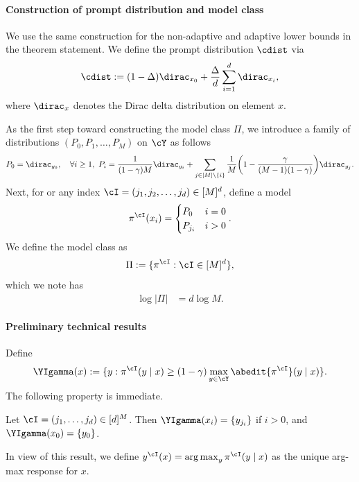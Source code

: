\paragraph{Construction of prompt distribution and model class}
We use the same construction for the non-adaptive and adaptive lower
bounds in the theorem statement. We define the prompt distribution $\cdist$ via
\begin{align}
    \cdist:= (1 - \Delta) \dirac_{x_0} +  \frac{\Delta}{d}
    \sum_{i=1}^d \dirac_{x_i},
\end{align}
where $\dirac_x$ denotes the Dirac delta distribution on element $x$.

As the first step toward constructing the model class $\Pi$, we
introduce a family of distributions $(P_0,P_1,\dots,P_M)$  on $\cY$ as follows
\begin{align}
    P_0 = \dirac_{y_0}, \quad \forall i \ge 1,~ P_{i} = \frac{1}{(1-\gamma)M}\dirac_{y_i} + \sum_{j \in [M] \setminus \{i\}} \frac{1}{M}\prn*{1 - \frac{\gamma}{(M-1)(1-\gamma)}} \dirac_{y_j}.
\end{align}
Next, for or any index $\cI = (j_1,j_2,\dots,j_d)\in
[M]^d$, define a model
\begin{align}
    \pi^{\cI}(x_i) =  \begin{cases} P_0 & i = 0\\
    P_{j_i} & i > 0
    \end{cases}.
\end{align}
We define the model class as
\begin{align}
    \Pi := \{\pi^{\cI}: \cI \in [M]^d\},
\end{align}
which we note has
\begin{align}
    \log |\Pi| &= d \log M. 
\end{align}

\paragraph{Preliminary technical results}
Define 
\begin{align}
    \YIgamma(x) := \{y: \pi^{\cI}(y \mid x) \ge (1-\gamma) \max_{y\in\cY}\abedit{\pi^{\cI}}(y\mid{}x)\}.
\end{align}
The following property is immediate.
\begin{lemma}\label{claim:Ygamma_lb} Let  $\cI = (j_1,\dots,j_d) \in
  [d]^M$. Then $\YIgamma(x_i) = \{y_{j_i}\}$ if $i > 0$, and $\YIgamma(x_0)=\crl{y_0}$.
\end{lemma}
In view of this result, we define $y^{\cI}(x) = \argmax_{y}
\pi^{\cI}(y\mid{}x)$ as the unique arg-max response for $x$.


